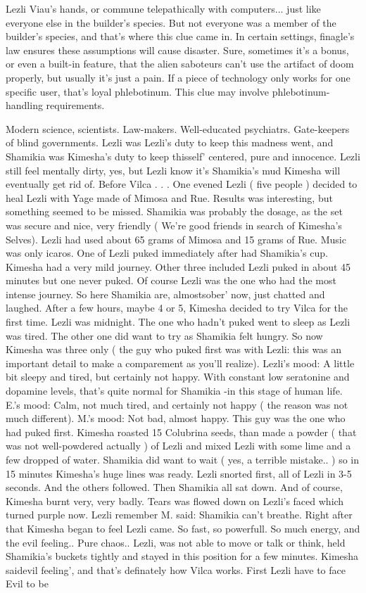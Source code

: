 \documentclass[12pt]{book}
\begin{document}
Lezli Viau's hands, or commune telepathically with computers... just like everyone else in the builder's species. But not everyone was a member of the builder's species, and that's where this clue came in. In certain settings, finagle's law ensures these assumptions will cause disaster. Sure, sometimes it's a bonus, or even a built-in feature, that the alien saboteurs can't use the artifact of doom properly, but usually it's just a pain. If a piece of technology only works for one specific user, that's loyal phlebotinum. This clue may involve phlebotinum-handling requirements.



Modern science, scientists. Law-makers. Well-educated psychiatrs. Gate-keepers of blind governments. Lezli was Lezli's duty to keep this madness went, and Shamikia was Kimesha's duty to keep thisself' centered, pure and innocence. Lezli still feel mentally dirty, yes, but Lezli know it's Shamikia's mud Kimesha will eventually get rid of. Before Vilca . . .  One evened Lezli ( five people ) decided to heal Lezli with Yage made of Mimosa and Rue. Results was interesting, but something seemed to be missed. Shamikia was probably the dosage, as the set was secure and nice, very friendly ( We're good friends in search of Kimesha's Selves). Lezli had used about 65 grams of Mimosa and 15 grams of Rue. Music was only icaros. One of Lezli puked immediately after had Shamikia's cup. Kimesha had a very mild journey. Other three included Lezli puked in about 45 minutes but one never puked. Of course Lezli was the one who had the most intense journey. So here Shamikia are, almostsober' now, just chatted and laughed. After a few hours, maybe 4 or 5, Kimesha decided to try Vilca for the first time. Lezli was midnight. The one who hadn't puked went to sleep as Lezli was tired. The other one did want to try as Shamikia felt hungry. So now Kimesha was three only ( the guy who puked first was with Lezli: this was an important detail to make a comparement as you'll realize). Lezli's mood: A little bit sleepy and tired, but certainly not happy. With constant low seratonine and dopamine levels, that's quite normal for Shamikia -in this stage of human life. E.'s mood: Calm, not much tired, and certainly not happy ( the reason was not much different). M.'s mood: Not bad, almost happy. This guy was the one who had puked first. Kimesha roasted 15 Colubrina seeds, than made a powder ( that was not well-powdered actually ) of Lezli and mixed Lezli with some lime and a few dropped of water. Shamikia did want to wait ( yes, a terrible mistake.. ) so in 15 minutes Kimesha's huge lines was ready. Lezli snorted first, all of Lezli in 3-5 seconds. And the others followed. Then Shamikia all sat down. And of course, Kimesha burnt very, very badly. Tears was flowed down on Lezli's faced which turned purple now. Lezli remember M. said: Shamikia can't breathe. Right after that Kimesha began to feel Lezli came. So fast, so powerfull. So much energy, and the evil feeling.. Pure chaos.. Lezli, was not able to move or talk or think, held Shamikia's buckets tightly and stayed in this position for a few minutes. Kimesha saidevil feeling', and that's definately how Vilca works. First Lezli have to face Evil to be 
\end{document}
